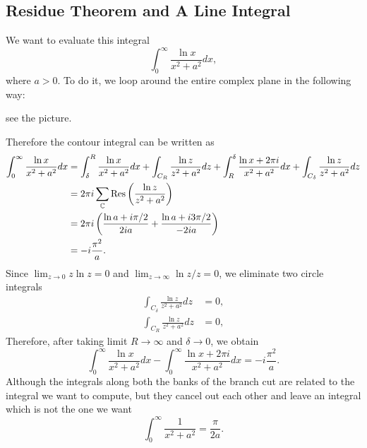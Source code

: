 \documentclass[10pt]{article}
\begin{document}
	\subsection{Residue Theorem and A Line Integral}

	We want to evaluate this integral
	\begin{equation}
		\int_0^{\infty} \frac{\ln x}{x^2 + a^2} dx,
	\end{equation}
	where $a>0$. To do it, we loop around the entire complex plane in the following way:

	see the picture.

	Therefore the contour integral can be written as
	\begin{align*}
		\int_0^{\infty} \frac{\ln x}{x^2 + a^2} dx &= \int_{\delta}^{R} \frac{\ln x}{x^2 + a^2} dx + \int_{C_R} \frac{\ln z}{z^2 + a^2} dz + \int^{\delta}_{R} \frac{\ln x + 2\pi i}{x^2 + a^2} dx + \int_{C_{\delta}} \frac{\ln z}{z^2 + a^2} dz \\
		&= 2\pi i \sum_{\mathbb{C}} \Res\left(\frac{\ln z}{z^2 + a^2}\right) \\
		&= 2\pi i \left(\frac{\ln a + i\pi/2}{2ia} + \frac{\ln a + i3\pi/2}{-2ia} \right) \\
		&= -i \frac{\pi^2}{a}.
	\end{align*}
	Since $\lim_{z\to0} z \ln z = 0$ and $\lim_{z \to \infty} \ln z/z = 0$, we eliminate two circle integrals
	\begin{align*}
		\int_{C_{\delta}} \frac{\ln z}{z^2 + a^2} dz &= 0,\\
		\int_{C_R} \frac{\ln z}{z^2 + a^2} dz &= 0,
	\end{align*}
	Therefore, after taking limit $R\to \infty$ and $\delta \to 0$, we obtain
	\begin{equation}
		\int_{0}^{\infty} \frac{\ln x}{x^2 + a^2} dx - \int_{0}^{\infty} \frac{\ln x + 2\pi i}{x^2 + a^2} dx = -i\frac{\pi^2}{a}.
	\end{equation}
	Although the integrals along both the banks of the branch cut are related to the integral we want to compute, but they cancel out each other and leave an integral which is not the one we want
	\begin{equation}
		\int_0^{\infty} \frac{1}{x^2 + a^2} = \frac{\pi}{2a}.
	\end{equation}
\end{document}
